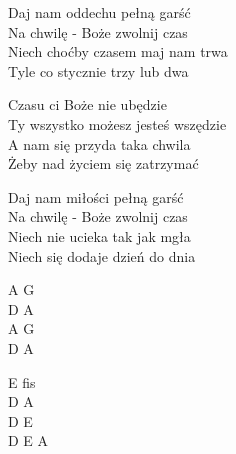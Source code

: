 \begin{text}
    Daj nam oddechu pełną garść\\
    Na chwilę - Boże zwolnij czas\\
    Niech choćby czasem maj nam trwa\\
    Tyle co stycznie trzy lub dwa

    \vin Czasu ci Boże nie ubędzie\\
    \vin Ty wszystko możesz jesteś wszędzie\\
    \vin A nam się przyda taka chwila\\
    \vin Żeby nad życiem się zatrzymać

    Daj nam miłości pełną garść\\
    Na chwilę - Boże zwolnij czas\\
    Niech nie ucieka tak jak mgła\\
    Niech się dodaje dzień do dnia
\end{text}
\begin{chord}
    A G\\
    D A\\
    A G\\
    D A

    E fis\\
    D A\\
    D E\\
    D E A
\end{chord}